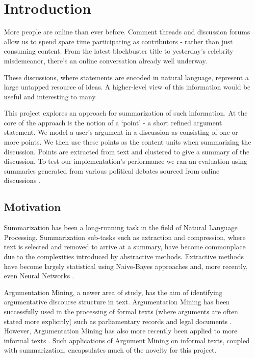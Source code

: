 \chapter{Introduction\label{chap:introduction}}
  More people are online than ever before. Comment threads and discussion forums allow us to spend spare time participating as contributors - rather than just consuming content. From the latest blockbuster title to yesterday's celebrity misdemeanor, there's an online conversation already well underway.

  These discussions, where statements are encoded in natural language, represent a large untapped resource of ideas. A higher-level view of this information would be useful and interesting to many.

  This project explores an approach for summarization of such information. At the core of the approach is the notion of a `point' - a short refined argument statement. We model a user's argument in a discussion as consisting of one or more points. We then use these points as the content units when summarizing the discussion. Points are extracted from text and clustered to give a summary of the discussion. To test our implementation's performance we ran an evaluation using summaries generated from various political debates sourced from online discussions \cite{walker2012corpus}.

  \section{Motivation}
    Summarization has been a long-running task in the field of Natural Language Processing. Summarization sub-tasks such as extraction and compression, where text is selected and removed to arrive at a summary, have become commonplace due to the complexities introduced by abstractive methods. Extractive methods have become largely statistical using Naive-Bayes \cite{kupiec1995trainable} approaches and, more recently, even Neural Networks \cite{svore2007enhancing}.

    Argumentation Mining, a newer area of study, has the aim of identifying argumentative discourse structure in text. Argumentation Mining has been successfully used in the processing of formal texts (where arguments are often stated more explicitly) such as parliamentary records \cite{palau2009argumentation} and legal documents \cite{montemagni2010semantic}. However, Argumentation Mining has also more recently been applied to more informal texts \cite{park2015conditional}. Such applications of Argument Mining on informal texts, coupled with summarization, encapsulates much of the novelty for this project.

